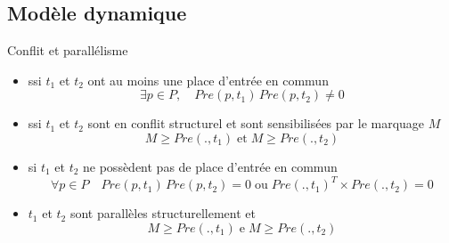 \documentclass[compress]{beamer}
\begin{document}
\subsection{Modèle dynamique}
\begin{frame}{Conflit et parallélisme}
\begin{itemize}
\item {} ssi  $t_1$ et $t_2$ ont au moins une place d'entrée en commun
	$$\exists p \in P, \quad Pre(p,t_1) \, Pre(p,t_2) \neq 0$$
\item {} ssi $t_1$ et $t_2$ sont en conflit structurel et sont sensibilisées par le marquage $M$
	$$M \geq Pre(.,t_1) \; \mbox{et} \; M \geq  Pre(.,t_2)$$
\item {} si $t_1$ et $t_2$ ne possèdent pas de place d'entrée en commun
	$$\forall p \in P \quad Pre(p,t_1) \, Pre(p,t_2) = 0  \;
	\mbox{ou} \; Pre(.,t_1)^T \times Pre(.,t_2) = 0$$
\item {} $t_1$ et $t_2$ sont parallèles structurellement et
$$M \geq Pre(.,t_1) \; \mbox{e} \; M \geq Pre(.,t_2)$$
\end{itemize}
\end{frame}
\end{document}
